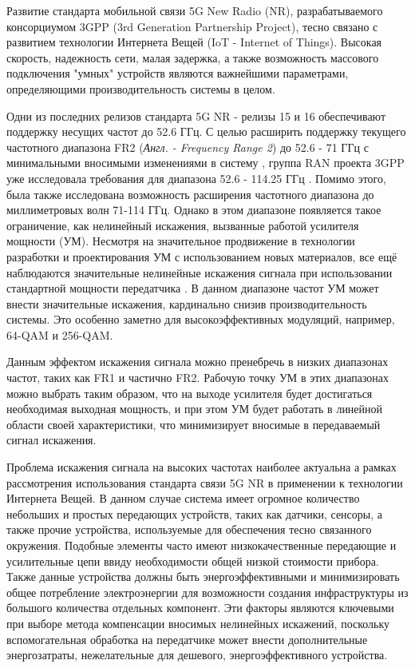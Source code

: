 \Introduction

Развитие стандарта мобильной связи 5G New Radio (NR), разрабатываемого консорциумом
3GPP (3rd Generation Partnership Project), тесно связано с развитием
технологии Интернета Вещей (IoT - Internet of Things). Высокая скорость,
надежность сети, малая задержка, а также возможность массового подключения
"умных" устройств являются важнейшими параметрами, определяющими
производительность системы в целом.

Одни из последних релизов стандарта 5G NR - релизы 15 и 16 обеспечивают
поддержку несущих частот до 52.6 ГГц. С целью расширить поддержку текущего
частотного диапазона FR2 (\textit{Англ. - Frequency Range 2}) до 52.6 - 71 ГГц с
минимальными вносимыми изменениями в систему \cite{intel193259}
\cite{qlcm193229}, группа RAN проекта 3GPP уже исследовала требования для
диапазона 52.6 - 114.25 ГГц \cite{3gpp.38.807}. Помимо этого, была также
исследована возможность расширения частотного диапазона до миллиметровых
волн 71-114 ГГц. Однако в этом диапазоне появляется такое ограничение, как
нелинейный искажения, вызванные работой усилителя мощности (УМ). Несмотря
на значительное продвижение в технологии разработки и проектирования УМ с
использованием новых материалов, все ещё наблюдаются значительные нелинейные
искажения сигнала при использовании стандартной мощности передатчика
\cite{zhang2021}. В данном диапазоне частот УМ может внести значительные
искажения, кардинально снизив производительность
системы. Это особенно заметно для высокоэффективных модуляций, например,
64-QAM и 256-QAM.

Данным эффектом искажения сигнала можно пренебречь в низких диапазонах
частот, таких как FR1 и частично FR2. Рабочую точку УМ в этих диапазонах
можно выбрать таким образом, что на выходе усилителя будет достигаться
необходимая выходная мощность, и при этом УМ будет работать в линейной
области своей характеристики, что минимизирует вносимые в передаваемый
сигнал искажения.

Проблема искажения сигнала на высоких частотах наиболее актуальна а рамках
рассмотрения использования стандарта связи 5G NR в применении к технологии
Интернета Вещей. В данном случае система имеет огромное количество
небольших и простых передающих устройств, таких как датчики, сенсоры, а
также прочие устройства, используемые для обеспечения тесно
связанного окружения. Подобные элементы часто имеют низкокачественные
передающие и усилительные цепи ввиду необходимости общей низкой стоимости
прибора. Также данные устройства должны быть энергоэффективными и
минимизировать общее потребление электроэнергии для возможности создания
инфраструктуры из большого количества отдельных компонент.
Эти факторы являются ключевыми при выборе метода компенсации вносимых
нелинейных искажений, поскольку вспомогательная обработка на передатчике
может внести дополнительные энергозатраты, нежелательные для дешевого,
энергоэффективного устройства.

